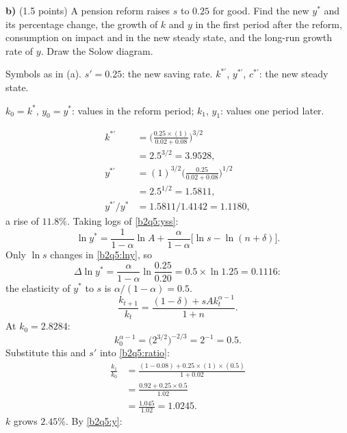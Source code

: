 \textbf{b)} (1.5 points) A pension reform raises $s$ to $0.25$ for good. Find the new $y^*$ and its percentage change, the growth of $k$
and $y$ in the first period after the reform, consumption on impact and in the new steady state, and the long-run growth rate of $y$.
Draw the Solow diagram.
\resolespaco
\begin{sol}
\begin{notacao}
\item Symbols as in (a). $s'=0.25$: the new saving rate. $k^{*\prime}$, $y^{*\prime}$, $c^{*\prime}$: the new steady state.
\item $k_0=k^*$, $y_0=y^*$: values in the reform period; $k_1$, $y_1$: values one period later.
\end{notacao}
\begin{align*}
k^{*\prime}&=\Big(\frac{0.25\times(1)}{0.02+0.08}\Big)^{3/2}\\
&=2.5^{3/2}=3.9528,\\
y^{*\prime}&=(1)^{3/2}\Big(\frac{0.25}{0.02+0.08}\Big)^{1/2}\\
&=2.5^{1/2}=1.5811,\\
y^{*\prime}/y^*&=1.5811/1.4142=1.1180,
\end{align*}
a rise of $11.8\%$. Taking logs of \eqref{b2q5:yss}:
\begin{equation}
\ln y^*=\frac{1}{1-\alpha}\ln A+\frac{\alpha}{1-\alpha}\big[\ln s-\ln(n+\delta)\big]. \label{b2q5:lny}
\end{equation}
Only $\ln s$ changes in \eqref{b2q5:lny}, so
\[
\Delta\ln y^*=\frac{\alpha}{1-\alpha}\ln\frac{0.25}{0.20}=0.5\times\ln1.25=0.1116 :
\]
the elasticity of $y^*$ to $s$ is $\alpha/(1-\alpha)=0.5$.
\begin{equation}
\frac{k_{t+1}}{k_t}=\frac{(1-\delta)+sAk_t^{\alpha-1}}{1+n}. \label{b2q5:ratio}
\end{equation}
At $k_0=2.8284$:
\[
k_0^{\alpha-1}=\big(2^{3/2}\big)^{-2/3}=2^{-1}=0.5 .
\]
Substitute this and $s'$ into \eqref{b2q5:ratio}:
\begin{align*}
\frac{k_1}{k_0}&=\frac{(1-0.08)+0.25\times(1)\times(0.5)}{1+0.02}\\
&=\frac{0.92+0.25\times0.5}{1.02}\\
&=\frac{1.045}{1.02}=1.0245 .
\end{align*}
$k$ grows $2.45\%$. By \eqref{b2q5:y}:
\begin{align*}

\end{align*}
\end{sol}
